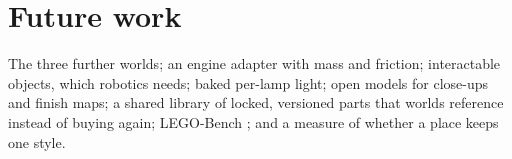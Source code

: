 \section{Future work}\label{future-work}

The three further worlds; an engine adapter with mass and friction; interactable objects, which robotics needs; baked per-lamp light; open models for close-ups and finish maps; a shared library of locked, versioned parts that worlds reference instead of buying again; LEGO-Bench \citep{li2026lego}; and a measure of whether a place keeps one style.
